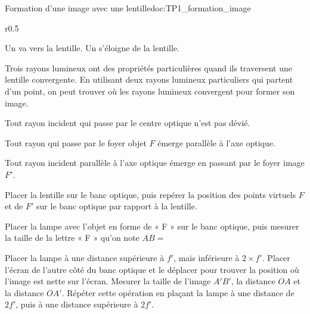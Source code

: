 \begin{doc}{Formation d'une image avec une lentille}{doc:TP1_formation_image}
  \begin{wrapfigure}[6]{r}{0.5\linewidth}
    \vspace{-20pt}
    \begin{boite}
      \vspace{-8pt}
      \begin{encart}
        Un  va vers la lentille.
        Un  s'éloigne de la lentille.
      \end{encart}
    \end{boite}
  \end{wrapfigure}
  
  Trois rayons lumineux ont des propriétés particulières quand ils traversent une lentille convergente. 
  En utilisant deux rayons lumineux particuliers qui partent d'un point, on peut trouver où les rayons lumineux convergent pour former son image.

  \begin{listePoints}
    \item Tout rayon incident qui passe par le centre optique n'est pas dévié.
    \item Tout rayon qui passe par le foyer objet $F$ émerge parallèle à l'axe optique.
    \item Tout rayon incident parallèle à l'axe optique émerge en passant par le foyer image $F'$.
  \end{listePoints}

  \begin{center}
  \end{center}
\end{doc}

\mesure
Placer la lentille sur le banc optique, puis repérer la position des points virtuels $F$ et de $F'$ sur le banc optique par rapport à la lentille.

\mesure
Placer la lampe avec l'objet en forme de « F » sur le banc optique, puis mesurer la taille de la lettre « F » qu'on note $AB =$ 

\mesure 
Placer la lampe à une distance supérieure à $f'$, mais inférieure à $2\times f'$. 
Placer l'écran de l'autre côté du banc optique et le déplacer pour trouver la position où l'image est nette sur l'écran.
Mesurer la taille de l'image $A'B'$, la distance $OA$ et la distance              $OA'$.
Répéter cette opération en plaçant la lampe à une distance de $2f'$, puis à une distance supérieure à $2f'$.


